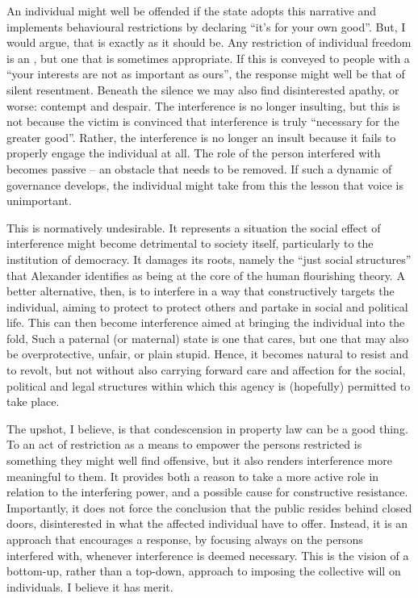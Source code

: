 An individual might well be offended if the state adopts this narrative and implements behavioural restrictions by declaring ``it's for your own good''. But, I would argue, that is exactly as it should be. Any restriction of individual freedom is an , but one that is sometimes appropriate. If this is conveyed to people with a  ``your interests are not as important as ours'', the response might well be that of silent resentment. Beneath the silence we may also find disinterested apathy, or worse: contempt and despair. The interference is no longer insulting, but this is not because the victim is convinced that interference is truly ``necessary for the greater good''. Rather, the interference is no longer an insult because it fails to properly engage the individual at all. The role of the person interfered with becomes passive --  an obstacle that needs to be removed. If such a dynamic of governance develops, the individual might take from this the lesson that  voice is unimportant.

This is normatively undesirable. It represents a situation  the social effect of interference might become detrimental to society itself, particularly to the institution of democracy. It damages its roots, namely the ``just social structures'' that Alexander identifies as being at the core of the human flourishing theory. A better alternative, then, is to interfere in a way that constructively targets the individual, aiming to protect  to protect others and partake in social and political life. This can then become interference aimed at bringing the individual into the fold,  Such a paternal (or maternal) state is one that cares, but one that may also be overprotective, unfair, or plain stupid. Hence, it becomes natural to resist and to revolt, but not without also carrying forward care and affection for the social, political and legal structures within which this agency is (hopefully) permitted to take place.

The upshot, I believe, is that condescension in property law can be a good thing. To  an act of restriction as a means to empower the persons restricted is something they might well find offensive, but it also renders interference more meaningful to them. It provides both a reason to take a more active role in relation to the interfering power, and a possible cause for constructive resistance. Importantly, it does not force the conclusion that the public resides behind closed doors, disinterested in what the affected individual have to offer. Instead, it is an approach that encourages a response, by focusing always on the persons interfered with, whenever interference is deemed necessary. This is the vision of a bottom-up, rather than a top-down, approach to imposing the collective will on individuals. I believe it has merit. 

